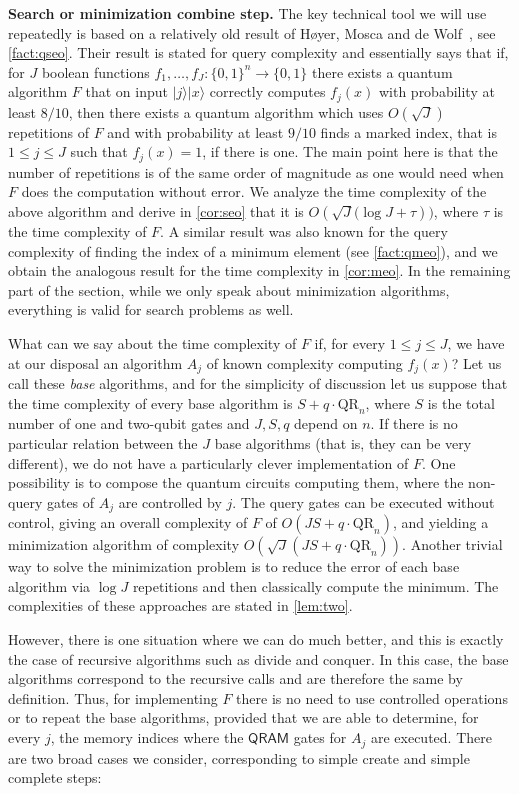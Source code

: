 \documentclass[12pt]{article}
\newcommand{\qr}{\mathrm{QR}}
\newcommand{\ket}[1]{|#1\rangle}
\theoremstyle{definition}
\begin{document}
{\bf Search or minimization combine step.} The key technical tool we will use repeatedly is based on  a relatively old result of H{\o}yer, Mosca and de Wolf~\cite{hoyer2003quantum}, see \cref{fact:qseo}. 
Their result is stated for query complexity and essentially says that if, for $J$ boolean functions $f_1, \ldots , f_J:\{0,1\}^n\rightarrow\{0,1\}$ there exists a quantum algorithm $F$ that on input $\ket{j} \ket{x} $ correctly computes $f_j(x)$ with probability at least $8/10$, then 
there exists a quantum algorithm which uses ${O}(\sqrt{J} )$ repetitions of $F$ and with probability at least $9/10$ finds a marked index, that is $1 \leq j \leq J$ such that $f_j(x)=1$, if there is one.
The main point here is that the number of repetitions is of the same order of magnitude as one would need when $F$ does the computation without error.
We analyze the time complexity of the above algorithm and derive in \cref{cor:seo} that it is ${O}({\sqrt{J} ( \log J + \tau}))$,  where $\tau$ is the time complexity of $F$.
A similar result was also known for the query complexity of finding the index of a minimum element (see \cref{fact:qmeo}), and we obtain the analogous result for the time complexity in \cref{cor:meo}. In the remaining part of the section, while we only speak about minimization algorithms, everything is valid for search problems as well.

What can we say about the time complexity of $F$ if, for every $1 \leq j \leq J$, we have at our disposal an algorithm $A_j$ of known complexity computing $f_j(x)$? Let us call these {\em base} algorithms, and for the simplicity of discussion let us suppose that the time complexity of every base algorithm is $S + q \cdot \qr_n$, where $S$ is the total number of one and two-qubit gates and $J, S, q$ depend on $n$. If there is no particular relation between the $J$ base algorithms (that is, they can be very different), we do not have a particularly clever implementation of $F$. One possibility is to compose the quantum circuits computing them, where the non-query gates of $A_j$ are controlled by $j$. The query gates can be executed without control, giving an overall complexity of $F$ of $O(JS + q \cdot \qr_n)$, and yielding a minimization algorithm of complexity $O(\sqrt{J}(JS + q \cdot \qr_n))$.
Another trivial way to solve the minimization problem is to reduce the error of each base algorithm via $\log J$ repetitions and then classically compute the minimum. The complexities of these approaches are stated in \cref{lem:two}.

However, there is one situation where we can do much better, and this is exactly the case of recursive algorithms such as divide and conquer.  In this case, the base algorithms correspond to the recursive calls and are therefore the same by definition. Thus, for implementing $F$ there is no need to use controlled operations or to repeat the base algorithms, provided that we are able to determine, for every $j$, the memory indices where the  $\mathsf{QRAM}$ gates for $A_j$ are executed. 
There are two broad cases we consider, corresponding to simple create and simple complete steps:
\end{document}
